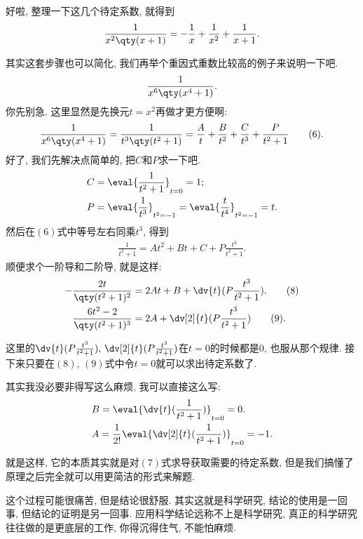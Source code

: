 \documentclass{ctexbook}
\begin{document}
{好啦, 整理一下这几个待定系数, 就得到
\begin{align*}
\frac{1}{x^{2}\qty(x+1)}=-\frac{1}{x}+\frac{1}{x^{2}}+\frac{1}{x+1}
.\end{align*}\par
其实这套步骤也可以简化, 我们再举个重因式重数比较高的例子来说明一下吧. 
\begin{align*}
\frac{1}{x^{6}\qty(x^{4}+1)}
.\end{align*}
你先别急. 这里显然是先换元$t=x^{2}$再做才更方便啊: 
\begin{align*}
\frac{1}{x^{6}\qty(x^{4}+1)}=\frac{1}{t^{3}\qty(t^{2}+1)}=\frac{A}{t}+\frac{B}{t^{2}}+\frac{C}{t^{3}}+\frac{P}{t^{2}+1}\tag{6}
.\end{align*}
好了, 我们先解决点简单的, 把$C$和$P$求一下吧. 
\begin{align*}
{}&C=\eval{\frac{1}{t^{2}+1}}_{t=0}=1;\\
{}&P=\eval{\frac{1}{t^{3}}}_{t^{2}=-1}=\eval{\frac{t}{t^{4}}}_{t^{2}=-1}=t
.\end{align*}
然后在$(6)$式中等号左右同乘$t^{3}$, 得到
\begin{align*}
\frac{1}{t^{2}+1}=At^{2}+Bt+C+P\frac{t^{3}}{t^{2}+1}\tag{7}
.\end{align*}
顺便求个一阶导和二阶导, 就是这样: 
\begin{align*}
-\frac{2t}{\qty(t^{2}+1)^{2}}={}&2At+B+\dv{t}(P\frac{t^{3}}{t^{2}+1}).\tag{8}\\
\frac{6t^{2}-2}{\qty(t^{2}+1)^{3}}={}&2A+\dv[2]{t}(P\frac{t^{3}}{t^{2}+1})\tag{9}
.\end{align*}\par
这里的$\dv{t}(P\frac{t^{3}}{t^{2}+1}),\,\dv[2]{t}(P\frac{t^{3}}{t^{2}+1})$在$t=0$的时候都是$0$, 也服从那个规律. 接下来只要在$(8),\,(9)$式中令$t=0$就可以求出待定系数了. \par
其实我没必要非得写这么麻烦, 我可以直接这么写: 
\begin{align*}
{}&B=\eval{\dv{t}(\frac{1}{t^{2}+1})}_{t=0}=0.\\
{}&A=\frac{1}{2!}\eval{\dv[2]{t}(\frac{1}{t^{2}+1})}_{t=0}=-1
.\end{align*}\par
就是这样, 它的本质其实就是对$(7)$式求导获取需要的待定系数, 但是我们搞懂了原理之后完全就可以用更简洁的形式来解题. \par
这个过程可能很痛苦, 但是结论很舒服. 其实这就是科学研究, 结论的使用是一回事, 但结论的证明是另一回事. 应用科学结论远称不上是科学研究, 真正的科学研究往往做的是更底层的工作, 你得沉得住气, 不能怕麻烦. \par
}
\end{document}
